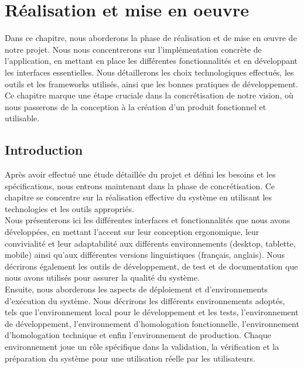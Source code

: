 \chapter{Réalisation et mise en oeuvre}
\par  Dans ce chapitre, nous aborderons la phase de réalisation et de mise en œuvre de notre projet. Nous nous concentrerons sur l'implémentation concrète de l'application, en mettant en place les différentes fonctionnalités et en développant les interfaces essentielles. Nous détaillerons les choix technologiques effectués, les outils et les frameworks utilisés, ainsi que les bonnes pratiques de développement. Ce chapitre marque une étape cruciale dans la concrétisation de notre vision, où nous passerons de la conception à la création d'un produit fonctionnel et utilisable.

\clearpage

\section{Introduction}
Après avoir effectué une étude détaillée du projet et défini les besoins et les spécifications, nous entrons maintenant dans la phase de concrétisation. Ce chapitre se concentre sur la réalisation effective du système en utilisant les technologies et les outils appropriés.\\

Nous présenterons ici les différentes interfaces et fonctionnalités que nous avons développées, en mettant l'accent sur leur conception ergonomique, leur convivialité et leur adaptabilité aux différents environnements (desktop, tablette, mobile) ainsi qu'aux différentes versions linguistiques (français, anglais). Nous décrirons également les outils de développement, de test et de documentation que nous avons utilisés pour assurer la qualité du système.\\

Ensuite, nous aborderons les aspects de déploiement et d'environnements d'exécution du système. Nous décrirons les différents environnements adoptés, tels que l'environnement local pour le développement et les tests, l'environnement de développement, l'environnement d'homologation fonctionnelle, l'environnement d'homologation technique et enfin l'environnement de production. Chaque environnement joue un rôle spécifique dans la validation, la vérification et la préparation du système pour une utilisation réelle par les utilisateurs.\\

